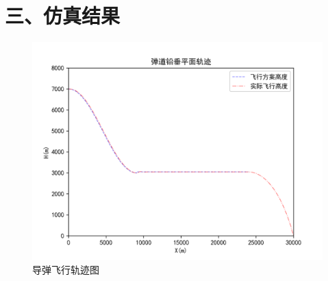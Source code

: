 \documentclass[UTF8]{ctexart}
\begin{document}
\section*{ 三、仿真结果}
\begin{figure}[H]
    \centering
    \includegraphics[width=130mm]{code/飞行轨迹.png}
    \caption{导弹飞行轨迹图}
\end{figure}
\end{document}
